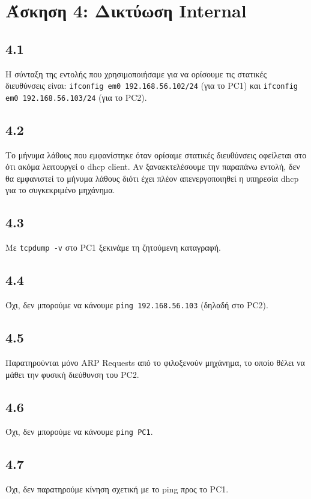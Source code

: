 \documentclass[a4paper, 12pt]{article}
\begin{document}
\section*{Άσκηση 4: Δικτύωση Internal}

	\subsection*{4.1} 
		Η σύνταξη της εντολής που χρησιμοποιήσαμε για να ορίσουμε τις στατικές διευθύνσεις είναι: \verb|ifconfig em0 192.168.56.102/24| (για το PC1) και \verb|ifconfig em0 192.168.56.103/24| (για το PC2).

	\subsection*{4.2} 
		Το μήνυμα λάθους που εμφανίστηκε όταν ορίσαμε στατικές διευθύνσεις οφείλεται στο ότι ακόμα λειτουργεί ο dhcp client. Αν ξαναεκτελέσουμε την παραπάνω εντολή, δεν θα εμφανιστεί το μήνυμα λάθους διότι έχει πλέον απενεργοποιηθεί η υπηρεσία dhcp για το συγκεκριμένο μηχάνημα.

	\subsection*{4.3} 
		Με \verb|tcpdump -v| στο PC1 ξεκινάμε τη ζητούμενη καταγραφή.

	\subsection*{4.4} 
		Όχι, δεν μπορούμε να κάνουμε \verb|ping 192.168.56.103| (δηλαδή στο PC2).

	\subsection*{4.5} 
		Παρατηρούνται μόνο ARP Requests από το φιλοξενούν μηχάνημα, το οποίο θέλει να μάθει την φυσική διεύθυνση του PC2.

	\subsection*{4.6} 
		Όχι, δεν μπορούμε να κάνουμε \verb|ping PC1|.

	\subsection*{4.7} 
		Όχι, δεν παρατηρούμε κίνηση σχετική με το ping προς το PC1.
\end{document}
